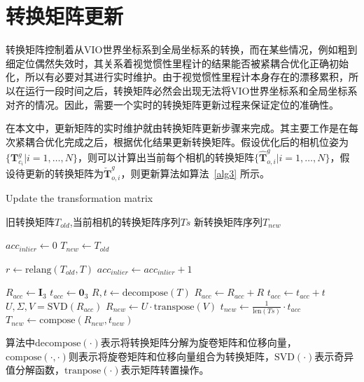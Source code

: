 \section{转换矩阵更新}

转换矩阵控制着从VIO世界坐标系到全局坐标系的转换，而在某些情况，例如粗到细定位偶然失效时，其关系着视觉惯性里程计的结果能否被紧耦合优化正确初始化，所以有必要对其进行实时维护。由于视觉惯性里程计本身存在的漂移累积，所以在运行一段时间之后，转换矩阵必然会出现无法将VIO世界坐标系和全局坐标系对齐的情况。因此，需要一个实时的转换矩阵更新过程来保证定位的准确性。

在本文中，更新矩阵的实时维护就由转换矩阵更新步骤来完成。其主要工作是在每次紧耦合优化完成之后，根据优化结果更新转换矩阵。假设优化后的相机位姿为$\{ \symbf{T}_{c_i}^g | i=1,\dots, N\}$，则可以计算出当前每个相机的转换矩阵$\{ \hat{\symbf{T}}_{o,i}^g | i=1,\dots, N\}$，假设待更新的转换矩阵为$\check{\symbf{T}}_{o,i}^g$，则更新算法如算法~\ref{alg3} 所示。
\renewcommand{\algorithmicrequire}{\textbf{输入：}\unskip}
\renewcommand{\algorithmicensure}{\textbf{输出：}\unskip}
\begin{algorithm}
  \caption{Update the transformation matrix}
  \label{alg3}
  \small
  \begin{algorithmic}[1]
    \REQUIRE 旧转换矩阵$T_{old}$,当前相机的转换矩阵序列$Ts$
    \ENSURE 新转换矩阵序列$T_{new}$

    \STATE $acc_{inlier} \leftarrow 0$
    \STATE $T_{new} \leftarrow T_{old}$

      \STATE $r \leftarrow \text{relang}(T_{old}, T)$
        \STATE $acc_{inlier} \leftarrow acc_{inlier} + 1$
      \ENDIF
    \ENDFOR

      \STATE $R_{acc} \leftarrow \symbf{I}_3$
      \STATE $t_{acc} \leftarrow \symbf{0}_3$
        \STATE $R,t \leftarrow \text{decompose}(T)$
        \STATE $R_{acc} \leftarrow R_{acc} + R$
        \STATE $t_{acc} \leftarrow t_{acc} + t$
      \ENDFOR
      \STATE $U, \Sigma, V = \text{SVD}(R_{acc})$
      \STATE $R_{new} \leftarrow U\cdot \text{transpose}(V)$
      \STATE $t_{new} \leftarrow \frac{1}{\text{len}(Ts)}\cdot t_{acc}$
      \STATE $T_{new} \leftarrow \text{compose}(R_{new}, t_{new})$
    \ENDIF
  \end{algorithmic}
\end{algorithm}

算法中$\text{decompose}(\cdot)$表示将转换矩阵分解为旋卷矩阵和位移向量，$\text{compose}(\cdot, \cdot)$则表示将旋卷矩阵和位移向量组合为转换矩阵，$\text{SVD}(\cdot)$表示奇异值分解函数，$\text{tranpose}(\cdot)$表示矩阵转置操作。

